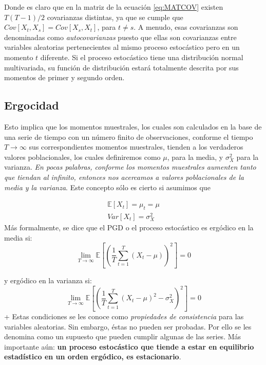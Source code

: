 \documentclass[
]{book}
\begin{document}
Donde es claro que en la matriz de la ecuación \eqref{eq:MATCOV} existen \(T(T-1)/2\) covarianzas distintas, ya que se cumple que \(Cov[X_t,X_s] = Cov[X_s,X_t]\), para \(t \neq s\). A menudo, esas covarianzas son denominadas como \emph{autocovarianzas} puesto que ellas son covarianzas entre variables aleatorias pertenecientes al mismo proceso estocástico pero en un momento \(t\) diferente. Si el proceso estocástico tiene una distribución normal multivariada, su función de distribución estará totalmente descrita por sus momentos de primer y segundo orden.

\hypertarget{ergocidad}{%
\subsection{Ergocidad}\label{ergocidad}}

Esto implica que los momentos muestrales, los cuales son calculados en la base de una serie de tiempo con un número finito de observaciones, conforme el tiempo \(T \rightarrow \infty\) sus correspondientes momentos muestrales, tienden a los verdaderos valores poblacionales, los cuales definiremos como \(\mu\), para la media, y \(\sigma^2_X\) para la varianza. \emph{En pocas palabras, conforme los momentos muestrales aumenten tanto que tiendan al infinito, entonces nos acercamos a valores poblacionales de la media y la varianza}.
Este concepto sólo es cierto si asumimos que

\begin{eqnarray*}
    \mathbb{E}[X_t] = \mu_t = \mu \\
    Var[X_t] = \sigma^2_X
\end{eqnarray*}
Más formalmente, se dice que el PGD o el proceso estocástico es ergódico en la media si:
\begin{equation}
    \displaystyle\lim_{T \to \infty}{\mathbb{E} \left[ \left( \frac{1}{T} \sum^{T}_{t = 1} (X_t - \mu) \right) ^2 \right]} = 0
\end{equation}

y ergódico en la varianza si:
\begin{equation}
    \displaystyle\lim_{T \to \infty}{\mathbb{E} \left[ \left( \frac{1}{T} \sum^{T}_{t = 1} (X_t - \mu) ^2 - \sigma^2_X \right) ^2 \right]} = 0
\end{equation}
+
Estas condiciones se les conoce como \emph{propiedades de consistencia} para las variables aleatorias. Sin embargo, éstas no pueden ser probadas. Por ello se les denomina como un supuesto que pueden cumplir algunas de las series. Más importante aún: \textbf{un proceso estocástico que tiende a estar en equilibrio estadístico en un orden ergódico, es estacionario}.
\end{document}
